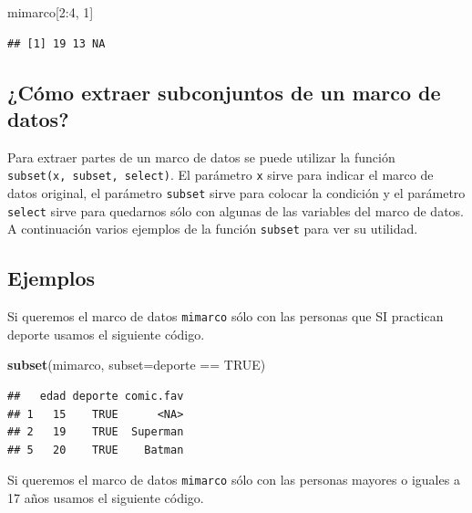 \documentclass[10pt,]{krantz}
\makeatletter
\newenvironment{Shaded}{\begin{snugshade}}{\end{snugshade}}
\newcommand{\KeywordTok}[1]{\textcolor[rgb]{0.13,0.29,0.53}{\textbf{{#1}}}}
\newcommand{\DataTypeTok}[1]{\textcolor[rgb]{0.13,0.29,0.53}{{#1}}}
\newcommand{\DecValTok}[1]{\textcolor[rgb]{0.00,0.00,0.81}{{#1}}}
\newcommand{\StringTok}[1]{\textcolor[rgb]{0.31,0.60,0.02}{{#1}}}
\newcommand{\OtherTok}[1]{\textcolor[rgb]{0.56,0.35,0.01}{{#1}}}
\newcommand{\NormalTok}[1]{{#1}}
\newenvironment{kframe}{%
\medskip{}
\setlength{\fboxsep}{.8em}
 \def\at@end@of@kframe{}%
 \ifinner\ifhmode%
  \def\at@end@of@kframe{\end{minipage}}%
  \begin{minipage}{\columnwidth}%
 \fi\fi%
 \def\FrameCommand##1{\hskip\@totalleftmargin \hskip-\fboxsep
 \colorbox{shadecolor}{##1}\hskip-\fboxsep
     \hskip-\linewidth \hskip-\@totalleftmargin \hskip\columnwidth}%
 \MakeFramed {\advance\hsize-\width
   \@totalleftmargin\z@ \linewidth\hsize
   \@setminipage}}%
 {\par\unskip\endMakeFramed%
 \at@end@of@kframe}
\renewenvironment{Shaded}{\begin{kframe}}{\end{kframe}}
\makeatother
\begin{document}
\begin{Shaded}
\begin{Highlighting}[]
\NormalTok{mimarco[}\DecValTok{2}\NormalTok{:}\DecValTok{4}\NormalTok{, }\DecValTok{1}\NormalTok{]}
\end{Highlighting}
\end{Shaded}

\begin{verbatim}
## [1] 19 13 NA
\end{verbatim}

\subsection{\texorpdfstring{¿Cómo extraer subconjuntos de un marco de
datos?
}{¿Cómo extraer subconjuntos de un marco de datos? }}\label{como-extraer-subconjuntos-de-un-marco-de-datos}

Para extraer partes de un marco de datos se puede utilizar la función
\texttt{subset(x,\ subset,\ select)}. El parámetro \texttt{x} sirve para
indicar el marco de datos original, el parámetro \texttt{subset} sirve
para colocar la condición y el parámetro \texttt{select} sirve para
quedarnos sólo con algunas de las variables del marco de datos. A
continuación varios ejemplos de la función \texttt{subset} para ver su
utilidad.

\subsection*{Ejemplos}\label{ejemplos}


Si queremos el marco de datos \texttt{mimarco} sólo con las personas que
SI practican deporte usamos el siguiente código.

\begin{Shaded}
\begin{Highlighting}[]
\KeywordTok{subset}\NormalTok{(mimarco, }\DataTypeTok{subset=}\NormalTok{deporte ==}\StringTok{ }\OtherTok{TRUE}\NormalTok{)}
\end{Highlighting}
\end{Shaded}

\begin{verbatim}
##   edad deporte comic.fav
## 1   15    TRUE      <NA>
## 2   19    TRUE  Superman
## 5   20    TRUE    Batman
\end{verbatim}

Si queremos el marco de datos \texttt{mimarco} sólo con las personas
mayores o iguales a 17 años usamos el siguiente código.
\end{document}
